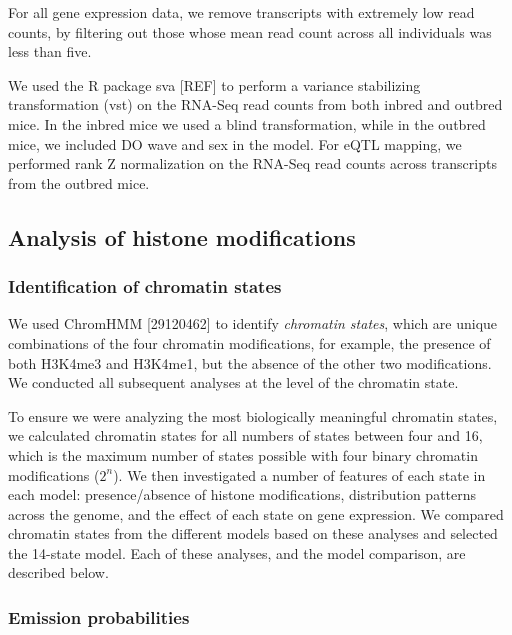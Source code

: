 \documentclass[10pt,letterpaper]{article}
\begin{document}
For all gene expression data, we remove transcripts with extremely low
read counts, by filtering out those whose mean read count across all
individuals was less than five.

We used the R package sva {[}REF{]} to perform a variance stabilizing
transformation (vst) on the RNA-Seq read counts from both inbred and
outbred mice. In the inbred mice we used a blind transformation, while
in the outbred mice, we included DO wave and sex in the model. For eQTL
mapping, we performed rank Z normalization on the RNA-Seq read counts
across transcripts from the outbred mice.

\hypertarget{analysis-of-histone-modifications}{%
\subsection{Analysis of histone
modifications}\label{analysis-of-histone-modifications}}

\hypertarget{identification-of-chromatin-states}{%
\subsubsection{Identification of chromatin
states}\label{identification-of-chromatin-states}}

We used ChromHMM {[}29120462{]} to identify \emph{chromatin states},
which are unique combinations of the four chromatin modifications, for
example, the presence of both H3K4me3 and H3K4me1, but the absence of
the other two modifications. We conducted all subsequent analyses at the
level of the chromatin state.

To ensure we were analyzing the most biologically meaningful chromatin
states, we calculated chromatin states for all numbers of states between
four and 16, which is the maximum number of states possible with four
binary chromatin modifications (\(2^n\)). We then investigated a number
of features of each state in each model: presence/absence of histone
modifications, distribution patterns across the genome, and the effect
of each state on gene expression. We compared chromatin states from the
different models based on these analyses and selected the 14-state
model. Each of these analyses, and the model comparison, are described
below.

\hypertarget{emission-probabilities}{%
\subsubsection{Emission probabilities}\label{emission-probabilities}}
\end{document}
